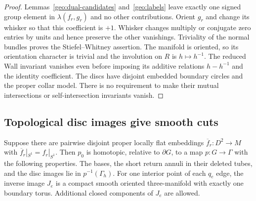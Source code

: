 \begin{proof}
Lemmas~\ref{geo:dual-candidates} and~\ref{geo:labels} leave exactly
one signed group element in $\lambda(f_r,g_r)$ and no other
contributions.  Orient $g_r$ and change its whisker so that this
coefficient is $+1$.  Whisker changes multiply or conjugate zero
entries by units and hence preserve the other vanishings.
Triviality of the normal bundles proves the Stiefel--Whitney
assertion.  The manifold is oriented, so its orientation character
is trivial and the involution on $R$ is $h\mapsto h^{-1}$.
The reduced Wall invariant vanishes even before imposing its
additive relations $h-h^{-1}$ and the identity coefficient.
The discs have disjoint embedded boundary circles and the proper
collar model.  There is no requirement to make their mutual
intersections or self-intersection invariants vanish.
\end{proof}

\subsection{Topological disc images give smooth cuts}

\begin{lemma}
\label{geo:topological-cuts}
Suppose there are pairwise disjoint proper locally flat embeddings
$\overline f_r:D^2\longrightarrow M$ with
$\overline f_r|_{S^1}=f_r|_{S^1}$.  Then $p_0$ is homotopic,
relative to $\partial G$, to a map $p:G\longrightarrow\Gamma$
with the following properties.  The bases, the short return
annuli in their deleted tubes, and the disc images lie in
$p^{-1}(\Gamma_h)$.  For one interior point of each $q_e$ edge,
the inverse image $J_e$ is a compact smooth oriented
three-manifold with exactly one boundary torus.  Additional
closed components of $J_e$ are allowed.
\end{lemma}

